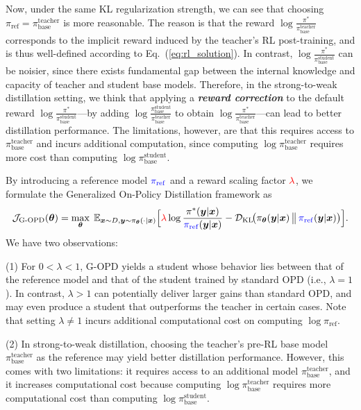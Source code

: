 \documentclass{article} %
\begin{document}
Now, under the same KL regularization strength, we can see that choosing $\pi_{\mathrm{ref}}=\pi_{\mathrm{base}}^{\mathrm{teacher}}$ is more reasonable. The reason is that the reward $\log \frac{\pi^{*}}{\pi_{\mathrm{base}}^{\mathrm{teacher}}}$ corresponds to the implicit reward induced by the teacher’s RL post-training, and is thus well-defined according to Eq.~(\ref{eq:rl_solution}). In contrast, $\log \frac{\pi^{*}}{\pi_{\mathrm{base}}^{\mathrm{student}}}$ can be noisier, since there exists fundamental gap between the internal knowledge and capacity of teacher and student base models. Therefore, in the strong-to-weak distillation setting, we think that applying a \emph{\textbf{reward correction}} to the default reward $\log \frac{\pi^{*}}{\pi_{\mathrm{base}}^{\mathrm{student}}}$—by adding $\log \frac{\pi_{\mathrm{base}}^{\mathrm{student}}}{\pi_{\mathrm{base}}^{\mathrm{teacher}}}$ to obtain $\log \frac{\pi^{*}}{\pi_{\mathrm{base}}^{\mathrm{teacher}}}$—can lead to better distillation performance. The limitations, however, are that this requires access to $\pi_{\mathrm{base}}^{\mathrm{teacher}}$ and incurs additional computation, since computing $\log \pi_{\mathrm{base}}^{\mathrm{teacher}}$ requires more cost than computing $\log \pi_{\mathrm{base}}^{\mathrm{student}}$.

\begin{remark}
\label{remark: G-OPD}
    By introducing a reference model $\textcolor{blue}{\pi_{\mathrm{ref}}}$ and a reward scaling factor $\textcolor{red}{\lambda}$, we formulate the Generalized On-Policy Distillation framework as 
    $$
    \mathcal{J}_{\text{G-OPD}}(\boldsymbol{\theta})  =
\max_{\boldsymbol{\theta}}\;
\mathbb{E}_{\boldsymbol{x} \sim D, \boldsymbol{y} \sim \pi_{\boldsymbol{\theta}} (\cdot | \boldsymbol{x}) }\Big[ \textcolor{red}{\lambda}
\log  \frac{\pi^{*}(\boldsymbol{y}| \boldsymbol{x} )}{\textcolor{blue}{\pi_{\mathrm{ref}}} (\boldsymbol{y}| \boldsymbol{x} )}  - \mathcal{D}_{\mathrm{KL}} \!\big(
\pi_{\boldsymbol{\theta}}(\boldsymbol{y} | \boldsymbol{x})
\,\big\|\,
\textcolor{blue}{\pi_{\mathrm{ref}}}( \boldsymbol{y} | \boldsymbol{x})
\big)
\Big].
    $$
We have two observations:

(1) For $0<\lambda<1$, G-OPD yields a student whose behavior lies between that of the reference model and that of the student trained by standard OPD (i.e., $\lambda=1$). In contrast, $\lambda>1$ can potentially deliver larger gains than standard OPD, and may even produce a student that outperforms the teacher in certain cases. Note that setting $\lambda \neq 1$ incurs additional computational cost on computing $\log \pi_{\mathrm{ref}}$. 

(2) In strong-to-weak distillation, choosing the teacher’s pre-RL base model $\pi_{\mathrm{base}}^{\mathrm{teacher}}$ as the reference may yield better distillation performance. However, this comes with two limitations: it requires access to an additional model $\pi_{\mathrm{base}}^{\mathrm{teacher}}$, and it increases computational cost because computing $\log \pi_{\mathrm{base}}^{\mathrm{teacher}}$ requires more computational cost than computing $\log \pi_{\mathrm{base}}^{\mathrm{student}}$.
\end{remark}
\end{document}
